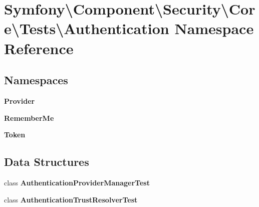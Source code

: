\section{Symfony\textbackslash{}Component\textbackslash{}Security\textbackslash{}Core\textbackslash{}Tests\textbackslash{}Authentication Namespace Reference}
\label{namespace_symfony_1_1_component_1_1_security_1_1_core_1_1_tests_1_1_authentication}
\subsection*{Namespaces}
\begin{DoxyCompactItemize}
\item 
 {\bf Provider}
\item 
 {\bf Remember\+Me}
\item 
 {\bf Token}
\end{DoxyCompactItemize}
\subsection*{Data Structures}
\begin{DoxyCompactItemize}
\item 
class {\bf Authentication\+Provider\+Manager\+Test}
\item 
class {\bf Authentication\+Trust\+Resolver\+Test}
\end{DoxyCompactItemize}
